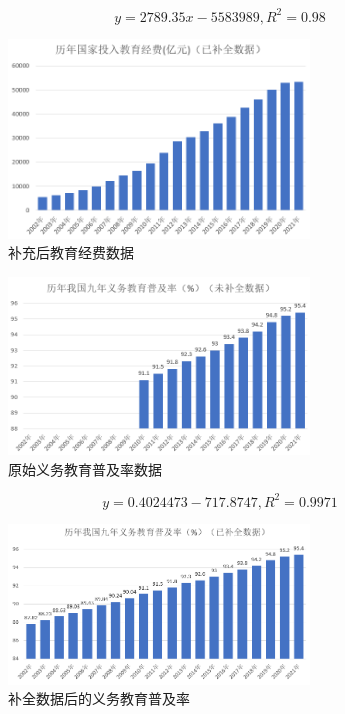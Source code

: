 \documentclass[UTF8]{article}
\begin{document}
	\vspace{-10pt}
	$$
		y=2789.35x-5583989,R^2=0.98
	$$
	\begin{figure}[htb]
	\centering
	\includegraphics[width=8cm]{pictures/bcjyjf.png}
	\caption{补充后教育经费数据}
	\label{bcjyjf}
	\end{figure}
	\newpage
	\begin{figure}[htb]
		\centering
		\includegraphics[width=8cm]{pictures/ysywjy.png}
		\caption{原始义务教育普及率数据}
		\label{ysywjy}
	\end{figure}
	$$
		y=0.4024473-717.8747,R^2=0.9971
	$$
	\begin{figure}[htb]
	\centering
	\includegraphics[width=8cm]{pictures/bcywjy.png}
	\caption{补全数据后的义务教育普及率}
	\label{bcywjy}
	\end{figure}
\end{document}
